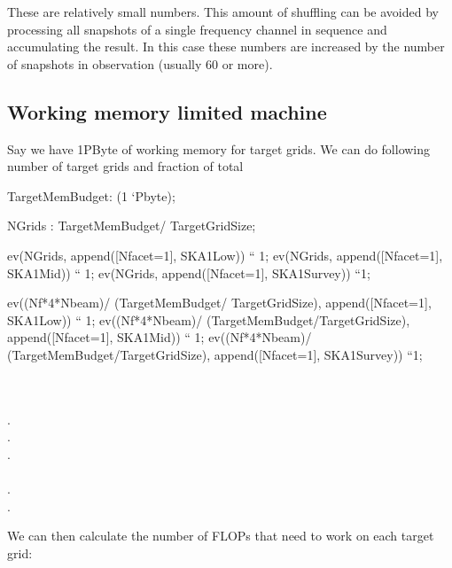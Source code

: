 \documentclass[useAMS,usenatbib,referee]{article}
\begin{document}
These are relatively small numbers. This amount of shuffling can be
avoided by processing all snapshots of a single frequency channel in
sequence and accumulating the result. In this case these numbers are
increased by the number of snapshots in observation (usually 60 or
more).


\subsection{Working memory limited machine}

Say we have 1PByte of working memory for target grids. We can do
following number of target grids and fraction of total
\begin{maxima}[]
TargetMemBudget: (1 `Pbyte);

NGrids : TargetMemBudget/ TargetGridSize;

ev(NGrids, append([Nfacet=1], SKA1Low)) `` 1;
ev(NGrids, append([Nfacet=1], SKA1Mid))  `` 1;
ev(NGrids, append([Nfacet=1], SKA1Survey)) ``1;

ev((Nf*4*Nbeam)/  (TargetMemBudget/ TargetGridSize), append([Nfacet=1], SKA1Low)) `` 1;
ev((Nf*4*Nbeam)/ (TargetMemBudget/TargetGridSize), append([Nfacet=1], SKA1Mid))  `` 1;
ev((Nf*4*Nbeam)/ (TargetMemBudget/TargetGridSize), append([Nfacet=1], SKA1Survey)) ``1;


\maximaoutput*
{}\; \\
 \\
. \\
. \\
. \\
 \\
. \\
. \\
\end{maxima}

We can then calculate the number of FLOPs that need to work on each
target grid:
\end{document}
